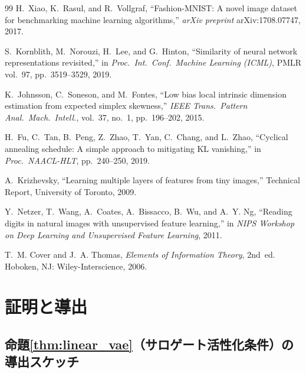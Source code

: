 \documentclass[11pt,a4paper]{jsarticle}
\begin{document}
\begin{thebibliography}{99}
H.~Xiao, K.~Rasul, and R.~Vollgraf,
``Fashion-MNIST: A novel image dataset for benchmarking machine learning
algorithms,''
\textit{arXiv preprint} arXiv:1708.07747, 2017.

S.~Kornblith, M.~Norouzi, H.~Lee, and G.~Hinton,
``Similarity of neural network representations revisited,''
in \textit{Proc.\ Int.\ Conf.\ Machine Learning (ICML)}, PMLR vol.~97,
pp.~3519--3529, 2019.

K.~Johnsson, C.~Soneson, and M.~Fontes,
``Low bias local intrinsic dimension estimation from expected simplex
skewness,''
\textit{IEEE Trans.\ Pattern Anal.\ Mach.\ Intell.}, vol.~37, no.~1,
pp.~196--202, 2015.

H.~Fu, C.~Tan, B.~Peng, Z.~Zhao, T.~Yan, C.~Chang, and L.~Zhao,
``Cyclical annealing schedule: A simple approach to mitigating KL
vanishing,''
in \textit{Proc.\ NAACL-HLT}, pp.~240--250, 2019.

A.~Krizhevsky,
``Learning multiple layers of features from tiny images,''
Technical Report, University of Toronto, 2009.

Y.~Netzer, T.~Wang, A.~Coates, A.~Bissacco, B.~Wu, and A.~Y. Ng,
``Reading digits in natural images with unsupervised feature learning,''
in \textit{NIPS Workshop on Deep Learning and Unsupervised Feature
Learning}, 2011.

T.~M. Cover and J.~A. Thomas,
\textit{Elements of Information Theory}, 2nd~ed.
Hoboken, NJ: Wiley-Interscience, 2006.

\end{thebibliography}

\appendix

\section{証明と導出}\label{app:proofs}

\subsection{命題\ref{thm:linear_vae}（サロゲート活性化条件）の導出スケッチ}
\end{document}

